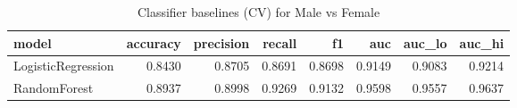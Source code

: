\begin{table}
\caption{Classifier baselines (CV) for Male vs Female}
\label{tab:clf_male_female}
\begin{tabular}{lrrrrrrr}
\toprule
model & accuracy & precision & recall & f1 & auc & auc_lo & auc_hi \\
\midrule
LogisticRegression & 0.8430 & 0.8705 & 0.8691 & 0.8698 & 0.9149 & 0.9083 & 0.9214 \\
RandomForest & 0.8937 & 0.8998 & 0.9269 & 0.9132 & 0.9598 & 0.9557 & 0.9637 \\
\bottomrule
\end{tabular}
\end{table}
